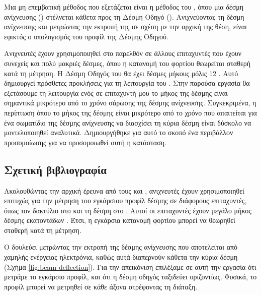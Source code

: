 Μια μη επεμβατική μέθοδος που εξετάζεται είναι η μέθοδος του , όπου μια δέσμη ανίχνευσης () στέλνεται κάθετα προς τη Δέσμη Οδηγό (). 
Ανιχνεύοντας τη δέσμη ανίχνευσης και μετρώντας την εκτροπή της σε σχέση με την αρχική της θέση, είναι εφικτός ο υπολογισμός του προφίλ της Δέσμης Οδηγού.

Ανιχνευτές  έχουν χρησιμοποιηθεί στο παρελθόν σε άλλους επιταχυντές που έχουν συνεχείς και πολύ μακριές δέσμες, όπου η κατανομή του φορτίου θεωρείται σταθερή κατά τη μέτρηση.
Η Δέσμη Οδηγός του  θα έχει δέσμες μήκους μόλις \num{12} . 
Αυτό δημιουργεί πρόσθετες προκλήσεις για τη λειτουργία του .
Στην παρούσα εργασία θα εξετάσουμε τη λειτουργία ενός  σε επιταχυντή μου το μήκος της δέσμης είναι σημαντικά μικρότερο από το χρόνο σάρωσης της δέσμης ανίχνευσης. 
Συγκεκριμένα, η περίπτωση όπου το μήκος της δέσμης είναι μικρότερο από το χρόνο που απαιτείται για ένα σωματίδιο της δέσμης ανίχνευσης να διασχίσει τη κύρια δέσμη είναι δύσκολο να μοντελοποιηθεί αναλυτικά. 
Δημιουργήθηκε για αυτό το σκοπό ένα περιβάλλον προσομοίωσης για να προσομοιωθεί αυτή η κατάσταση.

\subsection{Σχετική βιβλιογραφία} %
Ακολουθώντας την αρχική έρευνα από τους  και  \cite{Pasour1992}, ανιχνευτές  έχουν χρησιμοποιηθεί επιτυχώς για την μέτρηση του εγκάρσιου προφίλ δέσμης σε διάφορους επιταχυντές, όπως τον δακτύλιο  στο  \cite{Aleksandrov2005} \cite{Blokland2009} και τη δέσμη  στο  \cite{Roy2005}. 
Αυτοί οι επιταχυντές έχουν μεγάλο μήκος δέσμης εκατοντάδων . 
Έτσι, η εγκάρσια κατανομή φορτίου μπορεί να θεωρηθεί σταθερή κατά τη μέτρηση.

Ο  δουλεύει μετρώντας την εκτροπή της δέσμης ανίχνευσης που αποτελείται από χαμηλής ενέργειας ηλεκτρόνια, καθώς αυτά διαπερνούν κάθετα την κύρια δέσμη (Σχήμα \ref{fig:beam-deflection}).
Για την απεικόνιση επιλέξαμε σε αυτή την εργασία ότι μετράμε το εγκάρσιο προφίλ, και ότι η δέσμη οδηγός ταξιδεύει οριζοντίως. 
Φυσικά, το προφίλ μπορεί να μετρηθεί σε κάθε άξονα στρέφοντας τη διάταξη. 


